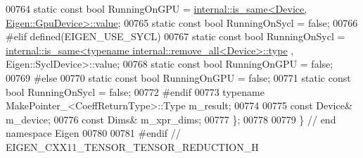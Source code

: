 \begin{DoxyCode}
00764   \textcolor{keyword}{static} \textcolor{keyword}{const} \textcolor{keywordtype}{bool} RunningOnGPU = 
      \hyperlink{struct_eigen_1_1internal_1_1is__same}{internal::is\_same<Device, Eigen::GpuDevice>::value};
00765   \textcolor{keyword}{static} \textcolor{keyword}{const} \textcolor{keywordtype}{bool} RunningOnSycl = \textcolor{keyword}{false};
00766 \textcolor{preprocessor}{#elif defined(EIGEN\_USE\_SYCL)}
00767 \textcolor{keyword}{static} \textcolor{keyword}{const} \textcolor{keywordtype}{bool} RunningOnSycl = 
      \hyperlink{struct_eigen_1_1internal_1_1is__same}{internal::is\_same<typename internal::remove\_all<Device>::type}
      , Eigen::SyclDevice>::value;
00768 \textcolor{keyword}{static} \textcolor{keyword}{const} \textcolor{keywordtype}{bool} RunningOnGPU = \textcolor{keyword}{false};
00769 \textcolor{preprocessor}{#else}
00770   \textcolor{keyword}{static} \textcolor{keyword}{const} \textcolor{keywordtype}{bool} RunningOnGPU = \textcolor{keyword}{false};
00771   \textcolor{keyword}{static} \textcolor{keyword}{const} \textcolor{keywordtype}{bool} RunningOnSycl = \textcolor{keyword}{false};
00772 \textcolor{preprocessor}{#endif}
00773   \textcolor{keyword}{typename} MakePointer\_<CoeffReturnType>::Type m\_result;
00774 
00775   \textcolor{keyword}{const} Device& m\_device;
00776   \textcolor{keyword}{const} Dims& m\_xpr\_dims;
00777 \};
00778 
00779 \} \textcolor{comment}{// end namespace Eigen}
00780 
00781 \textcolor{preprocessor}{#endif // EIGEN\_CXX11\_TENSOR\_TENSOR\_REDUCTION\_H}
\end{DoxyCode}
